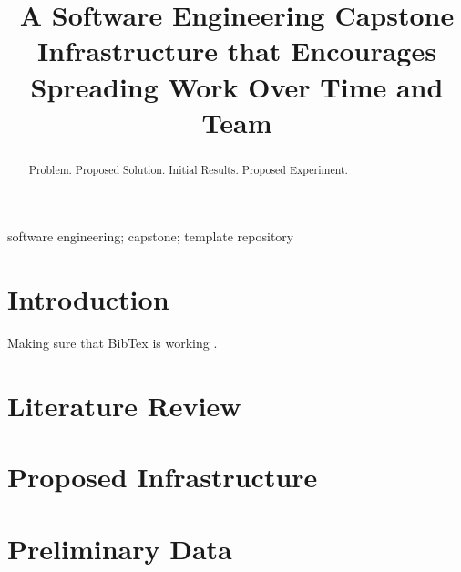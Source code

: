 \documentclass[10pt, conference]{IEEEtran}
\begin{document}
\title{A Software Engineering Capstone Infrastructure that Encourages Spreading
Work Over Time and Team}

\author{
}

\maketitle
  
\begin{abstract}

Problem. Proposed Solution. Initial Results. Proposed Experiment.

\end{abstract}

\begin{IEEEkeywords}
software engineering; capstone; template repository
\end{IEEEkeywords}

\section{Introduction} \label{SecIntro}

Making sure that BibTex is working \cite{Smith2005}.

\section{Literature Review} \label{SecLitReview}

\section{Proposed Infrastructure} \label{SecInfrastruct}

\section{Preliminary Data} \label{SecPrelimData}
\end{document}
